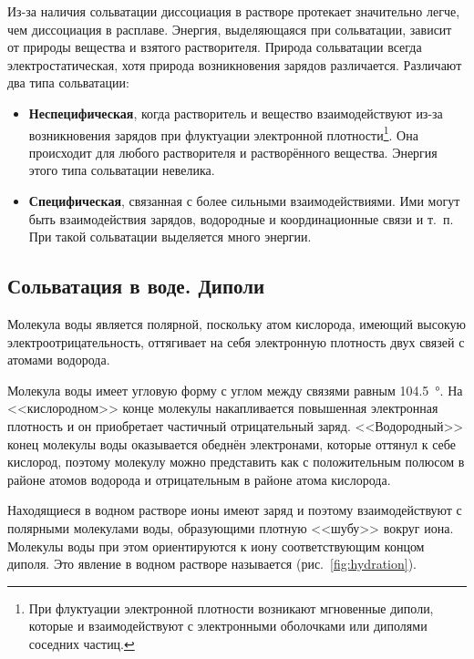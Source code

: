 
Из-за наличия сольватации диссоциация в растворе протекает значительно легче, чем диссоциация в расплаве. Энергия, выделяющаяся при сольватации, зависит от природы вещества и взятого растворителя. Природа сольватации всегда электростатическая, хотя природа возникновения зарядов различается. Различают два типа сольватации:

\begin{itemize}
    \item \textbf{Неспецифическая}, когда растворитель и вещество взаимодействуют из-за возникновения зарядов при флуктуации электронной плотности\footnote{При флуктуации электронной плотности возникают мгновенные диполи, которые и взаимодействуют с электронными оболочками или диполями соседних частиц.}. Она происходит для любого растворителя и растворённого вещества. Энергия этого типа сольватации невелика.
    \item \textbf{Специфическая}, связанная с более сильными взаимодействиями. Ими могут быть взаимодействия зарядов, водородные и координационные связи и т.~п. При такой сольватации выделяется много энергии.
\end{itemize}

\subsection*{Сольватация в воде. Диполи}

Молекула воды является полярной, поскольку атом кислорода, имеющий высокую электроотрицательность, оттягивает на себя электронную плотность двух связей с атомами водорода.

Молекула воды имеет угловую форму с углом между связями  равным \qty{104,5}{\degree}. На <<кислородном>> конце молекулы накапливается повышенная электронная плотность и он приобретает частичный отрицательный заряд. <<Водородный>> конец молекулы воды оказывается обеднён электронами, которые оттянул к себе кислород, поэтому молекулу можно представить как  с положительным полюсом в районе атомов водорода и отрицательным в районе атома кислорода.

Находящиеся в водном растворе ионы имеют заряд и поэтому взаимодействуют с полярными молекулами воды, образующими плотную <<шубу>> вокруг иона. Молекулы воды при этом ориентируются к иону соответствующим концом диполя. Это явление в водном растворе называется  (рис.~\ref{fig:hydration}).

